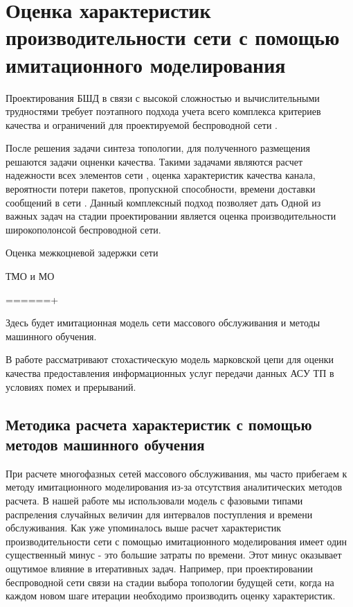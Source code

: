 \chapter{Оценка характеристик производительности сети с помощью имитационного моделирования}\label{prediction_model}

Проектирования БШД в связи с высокой сложностью и вычислительными трудностями требует поэтапного подхода учета всего комплекса критериев качества и ограничений для проектируемой беспроводной сети \cite{Vasiliev2015}.

После решения задачи синтеза топологии, для полученного размещения решаются задачи оцненки качества. Такими задачами являются расчет надежности всех элементов сети \cite{Wankpo2020, Krishnamoorthy2021, Kozyrev2019}, оценка характеристик качества канала, вероятности потери пакетов, пропускной способности, времени доставки сообщений в сети \cite{Gorbunova2020, Larionov2019, Vishnevsky2016_Methods_of_performance, Vishnevsky2016_Review_of_methodology, Wang2017, Sandmann2012, Baumann2017}. Данный комплексный подход позволяет дать
Одной из важных задач на стадии проектировании является оценка производительности широкополонсой беспроводной сети.

Оценка межкоцневой задержки сети \cite{Wang2017, Sandmann2012}

ТМО и МО \cite{Lovas2021, SatyaHermanto2018}

======+



Здесь будет имитационная модель сети массового обслуживания и методы машинного обучения.


В работе \cite{Eremenko2013} рассматривают стохастическую модель марковской цепи для оценки качества предоставления информационных услуг передачи данных АСУ ТП в условиях помех и прерываний.

\section{Методика расчета характеристик с помощью методов машинного обучения}


При расчете многофазных сетей массового обслуживания, мы часто прибегаем к методу имитационного моделирования из-за отсутствия аналитических методов расчета. В нашей работе мы использовали модель с фазовыми типами распреления случайных величин для интервалов поступления и времени обслуживания. Как уже упоминалось выше расчет характеристик производительности сети с помощью имитационного моделирования имеет один существенный минус - это большие затраты по времени. Этот минус оказывает ощутимое влияние в итеративных задач. Например, при проектировании беспроводной сети связи на стадии выбора топологии будущей сети, когда на каждом новом шаге итерации необходимо производить оценку характеристик.

